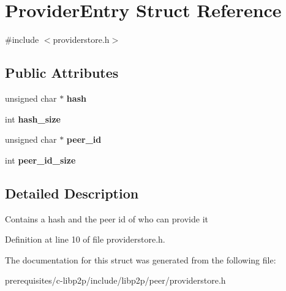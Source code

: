 \hypertarget{struct_provider_entry}{}\section{Provider\+Entry Struct Reference}
\label{struct_provider_entry}


{\ttfamily \#include $<$providerstore.\+h$>$}

\subsection*{Public Attributes}
\begin{DoxyCompactItemize}
\item 
\mbox{\label{struct_provider_entry_a213657c02bbddd153af7f33f8457a578}} 
unsigned char $\ast$ {\bfseries hash}
\item 
\mbox{\label{struct_provider_entry_a12e6df1e9072642422a222246f88bcb5}} 
int {\bfseries hash\+\_\+size}
\item 
\mbox{\label{struct_provider_entry_a8adaba77c31b168364f009fc5415b2ee}} 
unsigned char $\ast$ {\bfseries peer\+\_\+id}
\item 
\mbox{\label{struct_provider_entry_a09f8b81367446a01e6cf3fdfbfefe467}} 
int {\bfseries peer\+\_\+id\+\_\+size}
\end{DoxyCompactItemize}


\subsection{Detailed Description}
Contains a hash and the peer id of who can provide it 

Definition at line 10 of file providerstore.\+h.



The documentation for this struct was generated from the following file\+:\begin{DoxyCompactItemize}
\item 
prerequisites/c-\/libp2p/include/libp2p/peer/providerstore.\+h\end{DoxyCompactItemize}
